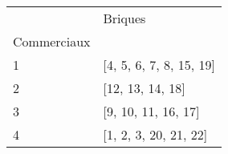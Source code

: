 \documentclass[preview]{standalone}
\begin{document}
    \begin{tabular}{ll}
\toprule
 & Briques \\
Commerciaux &  \\
\midrule
1 & [4, 5, 6, 7, 8, 15, 19] \\
2 & [12, 13, 14, 18] \\
3 & [9, 10, 11, 16, 17] \\
4 & [1, 2, 3, 20, 21, 22] \\
\bottomrule
\end{tabular}

    
\end{document}
